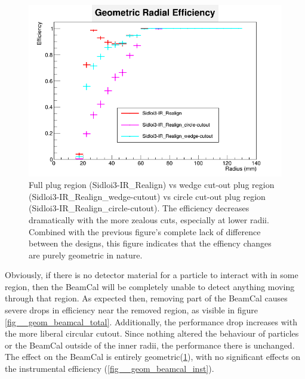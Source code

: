 \documentclass{report}
\begin{document}
                \begin{figure}[H]
                    \includegraphics[height=.4\textheight]{RadialEfficiency_geometric_geom}
                    \centering
                    \caption{Full plug region (Sidloi3-IR\_Realign) vs wedge cut-out plug region
                            (Sidloi3-IR\_Realign\_wedge-cutout) vs circle cut-out plug region
                            (Sidloi3-IR\_Realign\_circle-cutout). The efficiency decreases dramatically 
                            with the more zealous cuts, especially at lower radii. Combined with the 
                            previous figure's complete lack of difference between the designs, this figure
                            indicates that the effiency changes are purely geometric in nature.}
                    \label{fig__geom_beamcal_geom}
                \end{figure}

                Obviously, if there is no detector material for a particle to interact with in some region, then the BeamCal will be completely unable to detect anything moving through that region. As expected then, removing part of the BeamCal causes severe drops in efficiency near the removed region, as visible in figure \ref{fig__geom_beamcal_total}. Additionally, the performance drop increases with the more liberal circular cutout. Since nothing altered the behaviour of particles or the BeamCal outside of the inner radii, the performance there is unchanged. The effect on the BeamCal is entirely geometric(\ref{fig__geom_beamcal_geom}), with no significant effects on the instrumental efficiency (\ref{fig__geom_beamcal_inst}).
                
\end{document}
